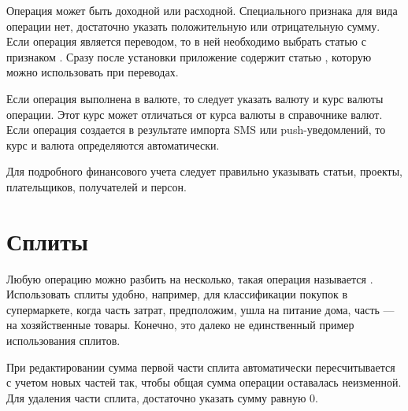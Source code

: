 \documentclass[a4paper,10pt,russian]{sphinxmanual}
\begin{document}
\noindent{}

\noindent{}

\noindent{}

Операция может быть доходной или расходной. Специального признака для вида операции нет, достаточно указать
положительную или отрицательную сумму. Если операция является переводом, то в ней необходимо выбрать статью
с признаком . Сразу после установки приложение содержит статью ,
которую можно использовать при переводах.

Если операция выполнена в валюте, то следует указать валюту и курс валюты операции. Этот курс может отличаться
от курса валюты в справочнике валют. Если операция создается в результате импорта SMS или push-уведомлений, то
курс и валюта определяются автоматически.

Для подробного финансового учета следует правильно указывать статьи, проекты, плательщиков, получателей и персон.


\section{Сплиты}
\label{\detokenize{transactions:id3}}
Любую операцию можно разбить на несколько, такая операция называется {\hyperref[\detokenize{glossary:term}]{}}. Использовать сплиты удобно, например,
для классификации покупок в супермаркете, когда часть затрат, предположим, ушла на питание дома, часть — на
хозяйственные товары. Конечно, это далеко не единственный пример использования сплитов.

При редактировании сумма первой части сплита автоматически пересчитывается с учетом новых частей так, чтобы
общая сумма операции оставалась неизменной. Для удаления части сплита, достаточно указать сумму равную 0.

\noindent{}

\noindent{}

\noindent{}
\end{document}
